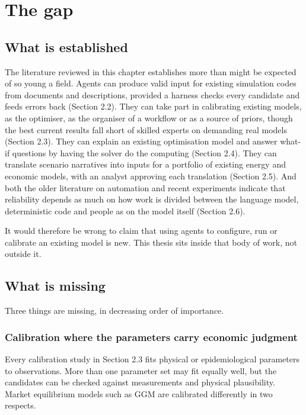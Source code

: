 \section{The gap}

\subsection{What is established}

The literature reviewed in this chapter establishes more than might be expected of so young a field.
Agents can produce valid input for existing simulation codes from documents and descriptions, provided a harness checks every candidate and feeds errors back (Section 2.2).
They can take part in calibrating existing models, as the optimiser, as the organiser of a workflow or as a source of priors, though the best current results fall short of skilled experts on demanding real models (Section 2.3).
They can explain an existing optimisation model and answer what-if questions by having the solver do the computing (Section 2.4).
They can translate scenario narratives into inputs for a portfolio of existing energy and economic models, with an analyst approving each translation (Section 2.5).
And both the older literature on automation and recent experiments indicate that reliability depends as much on how work is divided between the language model, deterministic code and people as on the model itself (Section 2.6).

It would therefore be wrong to claim that using agents to configure, run or calibrate an existing model is new.
This thesis sits inside that body of work, not outside it.

\subsection{What is missing}

Three things are missing, in decreasing order of importance.

\subsubsection{Calibration where the parameters carry economic judgment}

Every calibration study in Section 2.3 fits physical or epidemiological parameters to observations.
More than one parameter set may fit equally well, but the candidates can be checked against measurements and physical plausibility.
Market equilibrium models such as GGM are calibrated differently in two respects.


